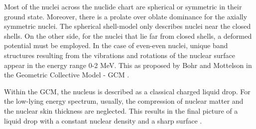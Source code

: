 Most of the nuclei across the nuclide chart are spherical or symmetric in their ground state. Moreover, there is a prolate over oblate dominance for the axially symmetric nuclei. The spherical shell-model only describes nuclei near the closed shells. On the other side, for the nuclei that lie far from closed shells, a deformed potential must be employed. In the case of even-even nuclei, unique band structures resulting from the vibrations and rotations of the nuclear surface appear in the energy range 0-2 MeV. This as proposed by Bohr and Mottelson \cite{bohr1998nuclear} in the Geometric Collective Model - GCM .

Within the GCM, the nucleus is described as a classical charged liquid drop. For the low-lying energy spectrum, usually, the compression of nuclear matter and the nuclear skin thickness are neglected. This results in the final picture of a liquid drop with a constant nuclear density and a sharp surface \cite{greiner1996nuclear}.
